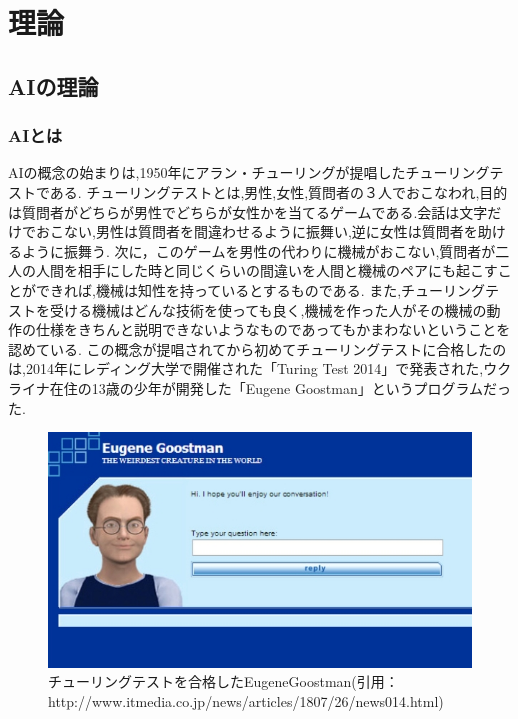 \chapter{理論}
\section{AIの理論}
\subsection{AIとは}
AIの概念の始まりは,1950年にアラン・チューリングが提唱したチューリングテストである.\cite{ronbun1}
チューリングテストとは,男性,女性,質問者の３人でおこなわれ,目的は質問者がどちらが男性でどちらが女性かを当てるゲームである.会話は文字だけでおこない,男性は質問者を間違わせるように振舞い,逆に女性は質問者を助けるように振舞う.
次に，このゲームを男性の代わりに機械がおこない,質問者が二人の人間を相手にした時と同じくらいの間違いを人間と機械のペアにも起こすことができれば,機械は知性を持っているとするものである.
また,チューリングテストを受ける機械はどんな技術を使っても良く,機械を作った人がその機械の動作の仕様をきちんと説明できないようなものであってもかまわないということを認めている.
この概念が提唱されてから初めてチューリングテストに合格したのは,2014年にレディング大学で開催された「Turing Test 2014」で発表された,ウクライナ在住の13歳の少年が開発した「Eugene Goostman」というプログラムだった.\\
\begin{figure}[!ht]
    \begin{screen}
    \begin{center}
        \includegraphics[scale=0.55, clip]{./img/Eugene_Goostman.jpg}
        \caption{チューリングテストを合格したEugeneGoostman\newline(引用：http://www.itmedia.co.jp/news/articles/1807/26/news014.html)}
        \label{fig:チューリングテストを合格したEugeneGoostman}
    \end{center}
\end{screen}
\end{figure}
